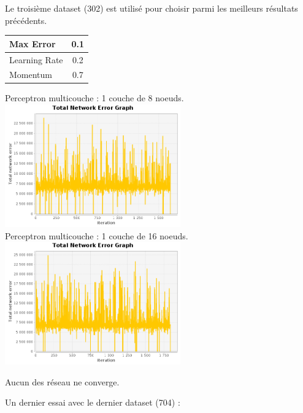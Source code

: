 \documentclass[10pt]{report}
\begin{document}
Le troisième dataset (302) est utilisé pour choisir parmi les meilleurs résultats précédents.

\begin{center}

\begin{tabular}{|l|c|}
	\hline
	Max Error & 0.1 \\
	\hline
	Learning Rate & 0.2 \\
	\hline
	Momentum & 0.7 \\
	\hline
\end{tabular}

Perceptron multicouche : 1 couche de 8 noeuds.\\
\includegraphics[height=200px]{img/SQUARE_8_302.png}\\
Perceptron multicouche : 1 couche de 16 noeuds.\\
\includegraphics[height=200px]{img/SQUARE_16_302.png}\\
\end{center}

Aucun des réseau ne converge.

Un dernier essai avec le dernier dataset (704) :
\end{document}
